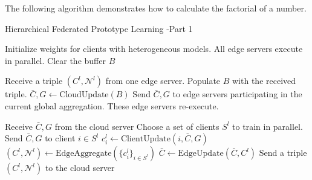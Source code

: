 \documentclass[journal]{IEEEtran}
\begin{document}
The following algorithm demonstrates how to calculate the factorial of a number.

\begin{algorithm}[H]
  \caption{Hierarchical Federated Prototype Learning -Part 1}
  \begin{algorithmic}[1]

    \State Initialize weights for clients with heterogeneous models.
    \State All edge servers execute in parallel.
    \State Clear the buffer \(B\)

     
    \State Receive a triple \( (C^l, \mathcal{N}^l) \) from one edge server.
    \State Populate \( B \) with the received triple.
    \EndWhile
    \State \( \bar{C}, G \gets \text{CloudUpdate}(B) \)
    \State Send \( \bar{C}, G \) to edge servers participating in the current global aggregation.
    \State These edge servers re-execute.
    \EndFor
    \EndProcedure

    \State Receive \( \bar{C}, G \) from the cloud server
    \State Choose a set of clients $S^l$ to train in parallel.
     
    \State Send \( \bar{C}, G \) to client \( i \in S^{l} \)
    \State \( c^l_i \gets \text{ClientUpdate}(i, \bar{C}, G) \)
    \EndFor {}
    \State \( (C^l, \mathcal{N}^l) \gets \text{EdgeAggregate}(\{ c^l_i \}_{i \in S^{l}}) \)
    \State \( \bar{C} \gets \text{EdgeUpdate}(\bar{C}, C^l) \) 
    \EndFor
    \State Send a triple \( (C^l, \mathcal{N}^l) \) to the cloud server
    \EndProcedure
  \end{algorithmic}
\end{algorithm}

\end{document}
